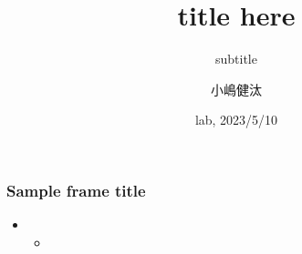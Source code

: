\documentclass{beamer}
\title[]{title here}
\subtitle{subtitle}
\author[小嶋健汰] 
{小嶋健汰\inst{1}}
\institute[静岡大学]
{
  \inst{1}
  情報学部行動情報学科4年\\
  静岡大学
}
\date[2023/5/10]
{lab, 2023/5/10}
\begin{document}
\frame{\titlepage}

\begin{frame}
	\frametitle{Sample frame title}
	\begin{itemize}
		\item 
		\begin{itemize}
			\item 
		\end{itemize}
	\end{itemize}
\end{frame}

\iffalse
\begin{frame}
	\frametitle{Sample frame title}
	\begin{itemize}
		\item 
		\begin{itemize}
			\item 
		\end{itemize}
	\end{itemize}
\end{frame}
\fi
\end{document}
